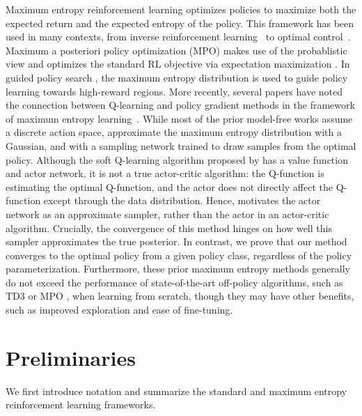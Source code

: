 Maximum entropy reinforcement learning optimizes policies to maximize both the expected return and the expected entropy of the policy. This framework has been used in many contexts, from inverse reinforcement learning~\citep{ziebart2008maximum} to optimal control~\citep{todorov2008general,toussaint2009robot,rawlik2012stochastic}. Maximum a posteriori policy optimization (MPO) makes use of the probablistic view and optimizes the standard RL objective via expectation maximization \cite{abdolmaleki2018maximum}. In guided policy search \citep{levine2013guided,levine2016end}, the maximum entropy distribution is used to guide policy learning towards high-reward regions. More recently, several papers have noted the connection between Q-learning and policy gradient methods in the framework of maximum entropy learning~\citep{o2016pgq,haarnoja2017reinforcement,nachum2017bridging,schulman2017equivalence}. While most of the prior model-free works assume a discrete action space, \citet{nachum2017trust} approximate the maximum entropy distribution with a Gaussian, and \citet{haarnoja2017reinforcement} with a sampling network trained to draw samples from the optimal policy. Although the soft Q-learning algorithm proposed by \citet{haarnoja2017reinforcement} has a value function and actor network, it is not a true actor-critic algorithm: the Q-function is estimating the optimal Q-function, and the actor does not directly affect the Q-function except through the data distribution. Hence, \citet{haarnoja2017reinforcement} motivates the actor network as an approximate sampler, rather than the actor in an actor-critic algorithm. Crucially, the convergence of this method hinges on how well this sampler approximates the true posterior. In contrast, we prove that our method converges to the optimal policy from a given policy class, regardless of the policy parameterization. Furthermore, these prior maximum entropy methods generally do not exceed the performance of state-of-the-art off-policy algorithms, such as TD3 \cite{fujimoto2018addressing} or MPO \cite{abdolmaleki2018maximum}, when learning from scratch, though they may have other benefits, such as improved exploration and ease of fine-tuning. 


\section{Preliminaries}
\label{sec:preliminaries}

We first introduce notation and summarize the standard and maximum entropy reinforcement learning frameworks.


